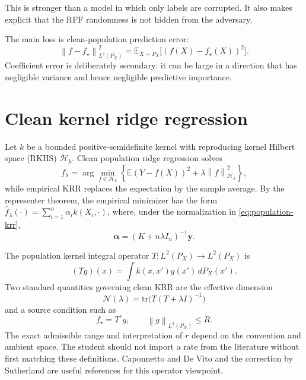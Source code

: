 \documentclass[11pt]{article}
\newcommand{\E}{\mathbb{E}}
\newcommand{\tr}{\mathrm{tr}}
\newcommand{\cH}{\mathcal{H}}
\newcommand{\norm}[1]{\left\lVert #1\right\rVert}
\begin{document}
This is stronger than a model in which only labels are corrupted.  It also
makes explicit that the RFF randomness is not hidden from the adversary.

The main loss is clean-population prediction error:
\begin{equation}\label{eq:prediction}
 \norm{f-f_\star}_{L^2(P_X)}^2
 =\E_{X\sim P_X}\bigl[(f(X)-f_\star(X))^2\bigr].
\end{equation}
Coefficient error is deliberately secondary: it can be large in a direction
that has negligible variance and hence negligible predictive importance.

\section{Clean kernel ridge regression}

Let $k$ be a bounded positive-semidefinite kernel with reproducing kernel
Hilbert space (RKHS) $\cH_k$.  Clean population ridge regression solves
\begin{equation}\label{eq:population-krr}
 f_\lambda=\arg\min_{f\in\cH_k}
 \left\{\E(Y-f(X))^2+\lambda\norm{f}_{\cH_k}^2\right\},
\end{equation}
while empirical KRR replaces the expectation by the sample average.  By the
representer theorem, the empirical minimizer has the form
$\widehat f_\lambda(\cdot)=\sum_{i=1}^n\alpha_i k(X_i,\cdot)$, where, under the
normalization in \cref{eq:population-krr},
\[
  \bm\alpha=(K+n\lambda I_n)^{-1}\bm y.
\]

The population kernel integral operator $T:L^2(P_X)\to L^2(P_X)$ is
\begin{equation}\label{eq:T}
  (Tg)(x)=\int k(x,x')g(x')\,dP_X(x').
\end{equation}
Two standard quantities governing clean KRR are the effective dimension
\begin{equation}\label{eq:effective-dim}
  \mathcal N(\lambda)=\tr\bigl(T(T+\lambda I)^{-1}\bigr)
\end{equation}
and a source condition such as
\begin{equation}\label{eq:kernel-source}
  f_\star=T^r g,\qquad \norm{g}_{L^2(P_X)}\leq R.
\end{equation}
The exact admissible range and interpretation of $r$ depend on the convention
and ambient space.  The student should not import a rate from the literature
without first matching these definitions.  Caponnetto and De Vito
\cite{caponnetto2007} and the correction by Sutherland \cite{sutherland2017}
are useful references for this operator viewpoint.
\end{document}
